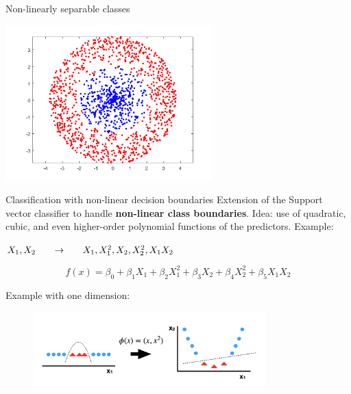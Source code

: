 \documentclass[notes]{beamer}          %
\begin{document}
\begin{frame}{Non-linearly separable classes}
\begin{center}
\includegraphics[height=6cm]{../figures/week_6/nonseparableclass.png}  
\end{center}


\end{frame}

\begin{frame}{Classification with non-linear decision boundaries}
Extension of the Support vector classifier to handle \textbf{non-linear class boundaries}. 
Idea: use of quadratic, cubic, and even higher-order polynomial functions of the predictors.
Example:
\begin{center}{
$X_1, X_2 \hspace{0.05\textwidth}\to\hspace{0.05\textwidth} X_1, X^2_1, X_2, X^2_2, X_1X_2$}
\end{center}
\begin{equation*}
	f(x)=\beta_0 + \beta_1X_1 + \beta_2X^2_1 + \beta_3X_2 + 		\beta_4X^2_2+ \beta_5X_1X_2 
\end{equation*}

Example with one dimension:
\begin{figure}
  \includegraphics[width=0.8\textwidth]{../figures/week_6/SVM_kernel}  
\end{figure}


\end{frame}
\end{document}
